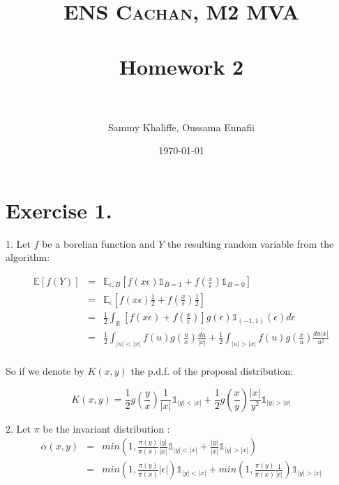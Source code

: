 \documentclass[paper=a4, fontsize=11pt]{scrartcl} %
\title{	
	\normalfont \normalsize 
	\textsc{ENS Cachan, M2 MVA} \\ [25pt] %
	\horrule{0.5pt} \\[0.4cm] %
	\huge  Homework 2\\ %
	\horrule{2pt} \\[0.5cm] %
}
\author{Sammy Khaliffe, Oussama Ennafii} %
\date{\normalsize\today} %
\numberwithin{equation}{section} %
\numberwithin{figure}{section} %
\numberwithin{table}{section} %
\begin{document}
	
	\maketitle %
	
	
	\section{Exercise 1.}
	
	1.  Let $f$ be a borelian function and $Y$ the resulting random variable from the algorithm:
	
	\begin{eqnarray*}
		\mathbb{E}[f(Y)] &=& \mathbb{E}_{\epsilon,B}[f(x \epsilon) \mathbb{1}_{B=1}+f(\frac{x}{\epsilon}) \mathbb{1}_{B=0}]\\
								  &=& \mathbb{E_{\epsilon}}[f(x \epsilon) \frac{1}{2}+f(\frac{x}{\epsilon}) \frac{1}{2}]\\
								  &=& \frac{1}{2} \int_{\mathbb{R}} [f(x \epsilon) +f(\frac{x}{\epsilon}) ] g(\epsilon) \mathbb{1}_{(-1,1)}(\epsilon)d\epsilon\\
								  &=& \frac{1}{2} \int_{|u|<|x|} f(u) g(\frac{u}{x}) \frac{du}{|x|} + \frac{1}{2} \int_{|u| > |x|} f(u) g(\frac{x}{u}) \frac{du |x|}{u^2}\\
	\end{eqnarray*}
	
	So if we denote by  $K(x,y)$ the p.d.f. of the proposal distribution:
	
	\begin{equation}
		K(x,y)=\frac{1}{2} g(\frac{y}{x}) \frac{1}{|x|} \mathbb{1}_{|y|<|x|} + \frac{1}{2} g(\frac{x}{y}) \frac{ |x|}{y^2} \mathbb{1}_{|y|>|x|} 
	\end{equation}
	
	2. Let $\pi$ be the invariant distribution :
	\begin{eqnarray*}
		\alpha(x,y) &=& min(1,\frac{\pi(y)}{\pi(x)} \frac{|y|}{|x|} \mathbb{1}_{|y|<|x|} + \frac{|y|}{|x|} \mathbb{1}_{|y|>|x|} )\\
						 &=& min(1,\frac{\pi(y)}{\pi(x)} |\epsilon| ) \mathbb{1}_{|y|<|x|}+  min(1,\frac{\pi(y)}{\pi(x)} \frac{1}{|\epsilon|} ) \mathbb{1}_{|y|>|x|}\\
	\end{eqnarray*}
	
\end{document}
